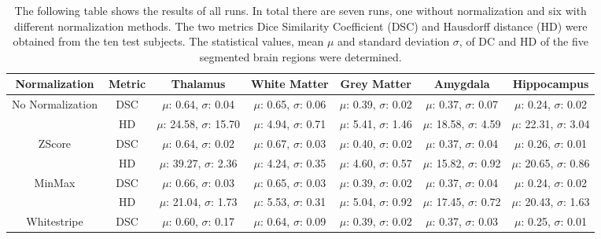 \documentclass[article]{IEEEtran}
\begin{document}
\onecolumn
\begin{table}[ht]
	\caption{The following table shows the results of all runs. In total there are seven runs, one without normalization and six with different normalization methods. The two metrics Dice Similarity Coefficient (DSC) and Hausdorff distance (HD) were obtained from the ten test subjects. The statistical values, mean $\mu$ and standard deviation $\sigma$, of DC and HD of the five segmented brain regions were determined.}
	\label{tab:diceHD}
	\begin{center}
	\begin{threeparttable}
	\begin{tabular}{c c c c c c c}
		\toprule
			\textbf{Normalization} & \textbf{Metric} &  \textbf{Thalamus} & \textbf{White Matter} & \textbf{Grey Matter} & \textbf{Amygdala} & \textbf{Hippocampus} \\ \midrule
		No Normalization			&	DSC		&	$\mu$: 0.64, $\sigma$: 0.04		&	$\mu$: 0.65, $\sigma$: 0.06		&	$\mu$: 0.39, $\sigma$: 0.02		&	$\mu$: 0.37, $\sigma$: 0.07		&	$\mu$: 0.24, $\sigma$: 0.02		\\ \cmidrule(lr{1em}){2-7}
								&	HD		&	$\mu$: 24.58, $\sigma$: 15.70	&	$\mu$: 4.94, $\sigma$: 0.71		&	$\mu$: 5.41, $\sigma$: 1.46		&	$\mu$: 18.58, $\sigma$: 4.59		&	$\mu$: 22.31, $\sigma$: 3.04	\\ \midrule
		ZScore					&	DSC		&	$\mu$: 0.64, $\sigma$: 0.02		&	$\mu$: 0.67, $\sigma$: 0.03		&	$\mu$: 0.40, $\sigma$: 0.02		&	$\mu$: 0.37, $\sigma$: 0.04		&	$\mu$: 0.26, $\sigma$: 0.01 	\\ \cmidrule(lr{1em}){2-7}
								&	HD		&	$\mu$: 39.27, $\sigma$: 2.36		&	$\mu$: 4.24, $\sigma$: 0.35		&	$\mu$: 4.60, $\sigma$: 0.57		&	$\mu$: 15.82, $\sigma$: 0.92		&	$\mu$: 20.65, $\sigma$: 0.86 	\\ \midrule
		MinMax 					&	DSC		&	$\mu$: 0.66, $\sigma$: 0.03		&	$\mu$: 0.65, $\sigma$: 0.03		&	$\mu$: 0.39, $\sigma$: 0.02		&	$\mu$: 0.37, $\sigma$: 0.04		&	$\mu$: 0.24, $\sigma$: 0.02 	\\ \cmidrule(lr{1em}){2-7}
								&	HD		&	$\mu$: 21.04, $\sigma$: 1.73		&	$\mu$: 5.53, $\sigma$: 0.31		&	$\mu$: 5.04, $\sigma$: 0.92		&	$\mu$: 17.45, $\sigma$: 0.72		&	$\mu$: 20.43, $\sigma$: 1.63 	\\ \midrule
		Whitestripe 				&	DSC		&	$\mu$: 0.60, $\sigma$: 0.17		&	$\mu$: 0.64, $\sigma$: 0.09		&	$\mu$: 0.39, $\sigma$: 0.02		&	$\mu$: 0.37, $\sigma$: 0.03		&	$\mu$: 0.25, $\sigma$: 0.01 	\\ \cmidrule(lr{1em}){2-7}

\end{tabular}
\end{threeparttable}
\end{center}
\end{table}
\end{document}
